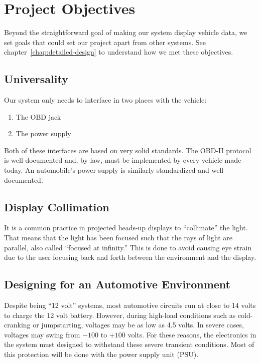 \chapter{Project Objectives}



Beyond the straightforward goal of making our system display vehicle data, we
set goals that could set our project apart from other systems. See
chapter~\ref{chap:detailed-design} to understand how we met these objectives.

\section{Universality}

Our system only needs to interface in two places with the vehicle:

\begin{enumerate}

\item The OBD jack
\item The power supply

\end{enumerate}

Both of these interfaces are based on very solid standards. The OBD-II protocol
is well-documented and, by law, must be implemented by every vehicle made
today. An automobile's power supply is similarly standardized and
well-documented.

\section{Display Collimation}

It is a common practice in projected heads-up displays to ``collimate'' the
light. That means that the light has been focused such that the rays of light
are parallel, also called ``focused at infinity.'' This is done to avoid
causing eye strain due to the user focusing back and forth between the
environment and the display.

\section{Designing for an Automotive Environment}

Despite being ``12 volt'' systems, most automotive circuits run at close to 
14 volts to charge the 12 volt battery. However, during high-load conditions 
such as cold-cranking or jumpstarting, voltages may be as low as 4.5 volts.  
In severe cases, voltages may swing from $-100$ to $+100$ volts. For these 
reasons, the electronics in the system must designed to withstand these severe
transient conditions. Most of this protection will be done with the power supply
unit (PSU).
